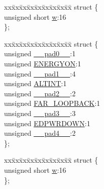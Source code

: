 \begin{DoxyCompactItemize}
\begin{tabbing}
\end{tabbing}\item 
\begin{tabbing}
xx\=xx\=xx\=xx\=xx\=xx\=xx\=xx\=xx\=\kill
struct \{\\
\>unsigned short \hyperlink{union_____m_o_d_e_c_t_r_lbits__t_a160850a4684a3e82c2323033964f2e98}{w}:16\\
\}; \\

\end{tabbing}\item 
\begin{tabbing}
xx\=xx\=xx\=xx\=xx\=xx\=xx\=xx\=xx\=\kill
struct \{\\
\>unsigned \hyperlink{union_____m_o_d_e_c_t_r_lbits__t_adf71f3d8410c1f1dbbc96680a92c49af}{\_\_pad0\_\_}:1\\
\>unsigned \hyperlink{union_____m_o_d_e_c_t_r_lbits__t_a0e6638c4dcc6fef3510e0b521a1aa8c8}{ENERGYON}:1\\
\>unsigned \hyperlink{union_____m_o_d_e_c_t_r_lbits__t_acaf2d0924a107ec6e8d2e31febaf66f9}{\_\_pad1\_\_}:4\\
\>unsigned \hyperlink{union_____m_o_d_e_c_t_r_lbits__t_a02caa18a58089bd11c8b233ff2a91441}{ALTINT}:1\\
\>unsigned \hyperlink{union_____m_o_d_e_c_t_r_lbits__t_a4d97cc5f7d51d22fc2bf3eab35c9cb7f}{\_\_pad2\_\_}:2\\
\>unsigned \hyperlink{union_____m_o_d_e_c_t_r_lbits__t_a7ece9ee327c35fb16496bda663df62ed}{FAR\_LOOPBACK}:1\\
\>unsigned \hyperlink{union_____m_o_d_e_c_t_r_lbits__t_ad7d7cee33e0c7f447abc4d171c628dd4}{\_\_pad3\_\_}:3\\
\>unsigned \hyperlink{union_____m_o_d_e_c_t_r_lbits__t_a28425f5c6c61ecfcf884f230ffe37bf0}{EDPWRDOWN}:1\\
\>unsigned \hyperlink{union_____m_o_d_e_c_t_r_lbits__t_a8d1e932de3f1bdec682271c90f2ca15c}{\_\_pad4\_\_}:2\\
\}; \\

\end{tabbing}\item 
\begin{tabbing}
xx\=xx\=xx\=xx\=xx\=xx\=xx\=xx\=xx\=\kill
struct \{\\
\>unsigned short \hyperlink{union_____m_o_d_e_c_t_r_lbits__t_a160850a4684a3e82c2323033964f2e98}{w}:16\\
\}; \\

\end{tabbing}\end{DoxyCompactItemize}


